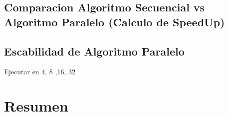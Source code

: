 \subsection{Comparacion Algoritmo Secuencial vs Algoritmo Paralelo (Calculo de SpeedUp)}

\subsection{Escabilidad de Algoritmo Paralelo }
Ejecutar en 4, 8 ,16, 32

\section{Resumen}

